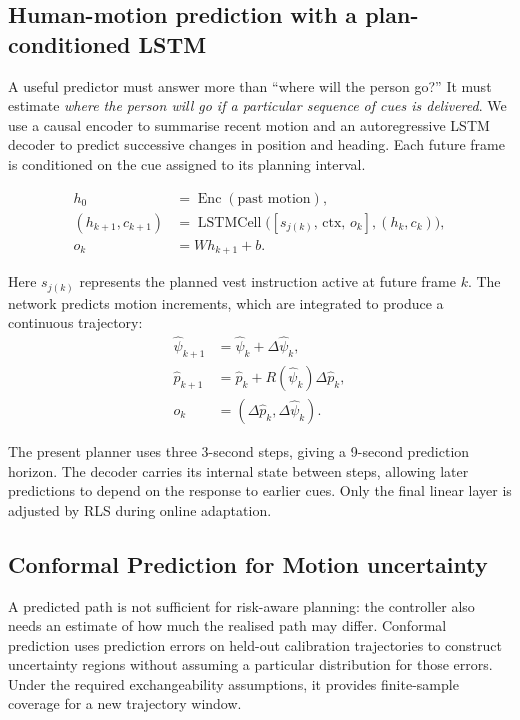 \documentclass[11pt,a4paper]{article}
\begin{document}
\subsection{Human-motion prediction with a plan-conditioned LSTM}
\label{sec:lstm}

A useful predictor must answer more than ``where will the person go?'' It must estimate \emph{where the person will go if a particular sequence of cues is delivered}. We use a causal encoder to summarise recent motion and an autoregressive LSTM decoder to predict successive changes in position and heading. Each future frame is conditioned on the cue assigned to its planning interval.

\begin{align}
 h_0 &= \operatorname{Enc}(\text{past motion}),\\
 (h_{k+1},c_{k+1}) &= \operatorname{LSTMCell}
 \bigl([s_{j(k)},\,\mathrm{ctx},\,o_k],(h_k,c_k)\bigr),\\
 o_k &= Wh_{k+1}+b.
\end{align}

Here $s_{j(k)}$ represents the planned vest instruction active at future frame $k$. The network predicts motion increments, which are integrated to produce a continuous trajectory:
\begin{align}
 \hat\psi_{k+1}&=\hat\psi_k+\Delta\hat\psi_k,\\
 \hat p_{k+1}&=\hat p_k+R(\hat\psi_k)\Delta\hat p_k,\\
 o_k&=(\Delta\hat p_k,\Delta\hat\psi_k).
\end{align}

The present planner uses three 3-second steps, giving a 9-second prediction horizon. The decoder carries its internal state between steps, allowing later predictions to depend on the response to earlier cues. Only the final linear layer is adjusted by RLS during online adaptation.

\subsection{Conformal Prediction for Motion uncertainty}
\label{sec:conformal}

A predicted path is not sufficient for risk-aware planning: the controller also needs an estimate of how much the realised path may differ. Conformal prediction uses prediction errors on held-out calibration trajectories to construct uncertainty regions without assuming a particular distribution for those errors. Under the required exchangeability assumptions, it provides finite-sample coverage for a new trajectory window.
\end{document}
